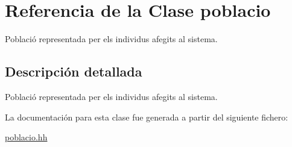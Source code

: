 \hypertarget{classpoblacio}{}\section{Referencia de la Clase poblacio}
\label{classpoblacio}


Població representada per els individus afegits al sistema.  




\subsection{Descripción detallada}
Població representada per els individus afegits al sistema. 

La documentación para esta clase fue generada a partir del siguiente fichero\+:\begin{DoxyCompactItemize}
\item 
\hyperlink{poblacio_8hh}{poblacio.\+hh}\end{DoxyCompactItemize}
